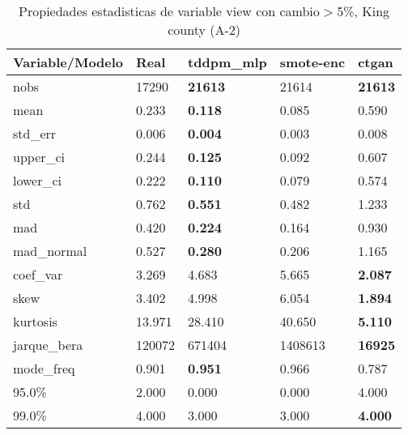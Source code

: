 \begin{table}[H]
\centering
\fontsize{8}{14}\selectfont
\caption{Propiedades estadisticas de variable view con cambio\ensuremath{>}5\%, King county (A-2)}
\label{table-stats-king county-a-2-view-short}
\begin{tabular}{|l|m{10em}|m{10em}|m{10em}|m{10em}|}
\hline
 \rowcolor[gray]{0.8}
Variable/Modelo & Real & tddpm\_mlp & smote-enc & ctgan \\
\hline nobs & 17290 & \bfseries 21613 & \cellcolor[rgb]{0.9, 0.54, 0.52} 21614 & \bfseries 21613 \\
\hline mean & 0.233 & \bfseries 0.118 & 0.085 & \cellcolor[rgb]{0.9, 0.54, 0.52} 0.590 \\
\hline std\_err & 0.006 & \bfseries 0.004 & 0.003 & \cellcolor[rgb]{0.9, 0.54, 0.52} 0.008 \\
\hline upper\_ci & 0.244 & \bfseries 0.125 & 0.092 & \cellcolor[rgb]{0.9, 0.54, 0.52} 0.607 \\
\hline lower\_ci & 0.222 & \bfseries 0.110 & 0.079 & \cellcolor[rgb]{0.9, 0.54, 0.52} 0.574 \\
\hline std & 0.762 & \bfseries 0.551 & 0.482 & \cellcolor[rgb]{0.9, 0.54, 0.52} 1.233 \\
\hline mad & 0.420 & \bfseries 0.224 & 0.164 & \cellcolor[rgb]{0.9, 0.54, 0.52} 0.930 \\
\hline mad\_normal & 0.527 & \bfseries 0.280 & 0.206 & \cellcolor[rgb]{0.9, 0.54, 0.52} 1.165 \\
\hline coef\_var & 3.269 & 4.683 & \cellcolor[rgb]{0.9, 0.54, 0.52} 5.665 & \bfseries 2.087 \\
\hline skew & 3.402 & 4.998 & \cellcolor[rgb]{0.9, 0.54, 0.52} 6.054 & \bfseries 1.894 \\
\hline kurtosis & 13.971 & 28.410 & \cellcolor[rgb]{0.9, 0.54, 0.52} 40.650 & \bfseries 5.110 \\
\hline jarque\_bera & 120072 & 671404 & \cellcolor[rgb]{0.9, 0.54, 0.52} 1408613 & \bfseries 16925 \\
\hline mode\_freq & 0.901 & \bfseries 0.951 & 0.966 & \cellcolor[rgb]{0.9, 0.54, 0.52} 0.787 \\
\hline 95.0\% & 2.000 & 0.000 & 0.000 & 4.000 \\
\hline 99.0\% & 4.000 & \cellcolor[rgb]{0.9, 0.54, 0.52} 3.000 & \cellcolor[rgb]{0.9, 0.54, 0.52} 3.000 & \bfseries 4.000 \\
\hline
\end{tabular}
\end{table}
